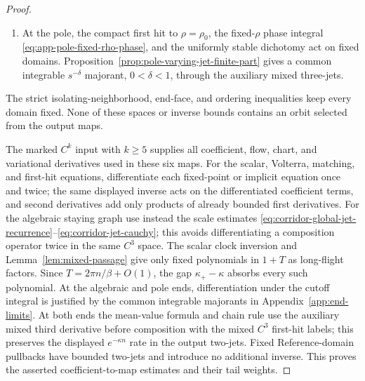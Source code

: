 \documentclass[11pt]{amsart}
\numberwithin{equation}{section}
\theoremstyle{definition}
\theoremstyle{remark}
\begin{document}
\begin{proof}
\begin{enumerate}
\begin{equation*}
 \mathcal R:\mathcal P\times\mathcal Y_1\to\mathcal Y_1,
 \qquad
 \mathcal D:I_{b_0}\times\mathcal P\times\mathcal X_\eta
       \to\mathcal X_\eta,
\end{equation*}
with inverse bounds $(1-\theta_{\mathrm r})^{-1}$ and
$(1-\theta_{\mathrm d})^{-1}$ from
\eqref{eq:app-alg-reference-contraction} and
\eqref{eq:app-alg-difference-contraction}.  The cutoff density differences
have one auxiliary mixed derivative beyond the $C^2$ output norm by
\eqref{eq:app-alg-density-majorants}.
\item At the pole, the compact first hit to $\rho=\rho_0$, the fixed-$\rho$
phase integral \eqref{eq:app-pole-fixed-rho-phase}, and the uniformly stable
dichotomy act on fixed domains.
Proposition~\ref{prop:pole-varying-jet-finite-part} gives a common
integrable $s^{-\delta}$ majorant, $0<\delta<1$, through the auxiliary
mixed three-jets.
\end{enumerate}
The strict isolating-neighborhood, end-face, and ordering inequalities keep
every domain fixed.
None of these spaces or inverse bounds contains an orbit selected from the
output maps.

The marked $C^k$ input with $k\ge5$ supplies all coefficient, flow, chart,
and variational derivatives used in these six maps.  For the scalar,
Volterra, matching, and first-hit equations, differentiate each fixed-point
or implicit equation once and twice; the same displayed inverse acts on
the differentiated coefficient terms, and second derivatives add only
products of already bounded first derivatives.  For the algebraic staying
graph use instead the scale estimates
\eqref{eq:corridor-global-jet-recurrence}--\eqref{eq:corridor-jet-cauchy};
this avoids differentiating a composition operator twice in the same
$C^3$ space.
The scalar clock inversion and Lemma~\ref{lem:mixed-passage} give only fixed
polynomials in $1+T$ as long-flight factors.  Since
$T=2\pi n/\beta+O(1)$, the gap
$\kappa_+-\kappa$ absorbs every such polynomial.  At the algebraic and
pole ends, differentiation under the cutoff integral is justified by the
common integrable majorants in Appendix~\ref{app:end-limits}.  At both ends
the mean-value formula and chain rule use the auxiliary mixed third
derivative before composition with the mixed $C^3$ first-hit labels; this
preserves the displayed $e^{-\kappa n}$ rate in the output two-jets.  Fixed
Reference-domain pullbacks have bounded two-jets and introduce no additional
inverse.  This proves the asserted coefficient-to-map estimates and their
tail weights.
\end{proof}
\end{document}
